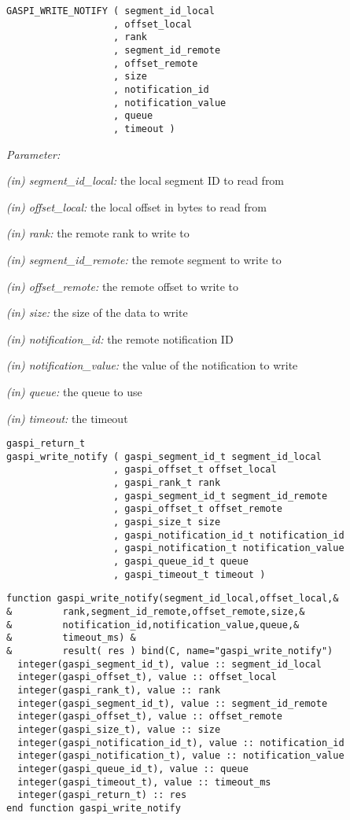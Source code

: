 \documentclass[a4paper]{article}
\newlength{\st}\setlength{\st}{0pt}
\newcommand{\parameter}[1]{{\it #1}}
\newenvironment{cbox}[1]
{\newcommand\colboxcolor{#1}\begin{lrbox}{\riddlebox}\begin{minipage}{\dimexpr\columnwidth-2\fboxsep\relax}}
{\end{minipage}\end{lrbox}\begin{center}\colorbox[HTML]{\colboxcolor}{\usebox{\riddlebox}}\end{center}}
\newcommand{\shortlistbegin}[1]{\begin{trivlist}\setlength{\itemsep}{0pt}\item[]\emph{#1:}}
\newcommand{\shortlistitem}[1]{\item[]#1}
\newcommand{\shortlistend}{\end{trivlist}}
\newenvironment{FDef}{\begin{trivlist}\item[]}{\end{trivlist}}
\newenvironment{FDefSign}{\begin{cbox}{EEEEEE}}{\end{cbox}}
\newcommand{\parameterlistbegin}{\shortlistbegin{Parameter}}
\newcommand{\parameterlistend}{\shortlistend}
\newcommand{\parameterlistitem}[3]{\shortlistitem{\parameter{(#1) #2:} {#3}}}
\begin{document}
\begin{FDef}

\begin{FDefSign}
\begin{verbatim}
GASPI_WRITE_NOTIFY ( segment_id_local
                   , offset_local
                   , rank
                   , segment_id_remote
                   , offset_remote
                   , size
                   , notification_id
                   , notification_value
                   , queue
                   , timeout )
\end{verbatim}
\end{FDefSign}

\parameterlistbegin
\parameterlistitem{in}{segment\_id\_local}{the local segment ID to read from}
\parameterlistitem{in}{offset\_local}{the local offset in bytes to read from}
\parameterlistitem{in}{rank}{the remote rank to write to}
\parameterlistitem{in}{segment\_id\_remote}{the remote segment to write to}
\parameterlistitem{in}{offset\_remote}{the remote offset to write to}
\parameterlistitem{in}{size}{the size of the data to write}
\parameterlistitem{in}{notification\_id}{the remote notification ID}
\parameterlistitem{in}{notification\_value}{the value of the notification to write}
\parameterlistitem{in}{queue}{the queue to use}
\parameterlistitem{in}{timeout}{the timeout}
\parameterlistend


\begin{FDefSign}
\begin{verbatim}
gaspi_return_t
gaspi_write_notify ( gaspi_segment_id_t segment_id_local
                   , gaspi_offset_t offset_local
                   , gaspi_rank_t rank
                   , gaspi_segment_id_t segment_id_remote
                   , gaspi_offset_t offset_remote
                   , gaspi_size_t size
                   , gaspi_notification_id_t notification_id
                   , gaspi_notification_t notification_value
                   , gaspi_queue_id_t queue
                   , gaspi_timeout_t timeout )
\end{verbatim}
\end{FDefSign}


\begin{FDefSign}
\begin{verbatim}
function gaspi_write_notify(segment_id_local,offset_local,&
&         rank,segment_id_remote,offset_remote,size,&
&         notification_id,notification_value,queue,&
&         timeout_ms) &
&         result( res ) bind(C, name="gaspi_write_notify")
  integer(gaspi_segment_id_t), value :: segment_id_local
  integer(gaspi_offset_t), value :: offset_local
  integer(gaspi_rank_t), value :: rank
  integer(gaspi_segment_id_t), value :: segment_id_remote
  integer(gaspi_offset_t), value :: offset_remote
  integer(gaspi_size_t), value :: size
  integer(gaspi_notification_id_t), value :: notification_id
  integer(gaspi_notification_t), value :: notification_value
  integer(gaspi_queue_id_t), value :: queue
  integer(gaspi_timeout_t), value :: timeout_ms
  integer(gaspi_return_t) :: res
end function gaspi_write_notify
\end{verbatim}
\end{FDefSign}



\end{FDef}
\end{document}
